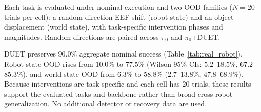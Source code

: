 \documentclass[letterpaper, 10 pt, conference]{ieeeconf}
\begin{document}
Each task is evaluated under nominal execution and two OOD families ($N{=}20$ trials per cell): a random-direction EEF shift (robot state) and an object displacement (world state), with task-specific intervention phases and magnitudes. Random directions are paired across $\pi_0$ and $\pi_0$+DUET.

\setlength{\textfloatsep}{1.2\baselineskip plus 2pt minus 2pt}
\begin{table}[t]
\caption{Franka success (\%, $\pi_0$-base; $N{=}20$/cell, $80$ overall). Robot: random-direction EEF shift; world: object shift. $\Delta$: +DUET minus $\pi_0$.}
\label{tab:real_robot}
\centering
\footnotesize
\setlength{\tabcolsep}{2.6pt}
\end{table}

DUET preserves $90.0\%$ aggregate nominal success (Table~\ref{tab:real_robot}). Robot-state OOD rises from $10.0\%$ to $77.5\%$ (Wilson $95\%$ CIs: $5.2$--$18.5\%$, $67.2$--$85.3\%$), and world-state OOD from $6.3\%$ to $58.8\%$ ($2.7$--$13.8\%$, $47.8$--$68.9\%$). Because interventions are task-specific and each cell has $20$ trials, these results support the evaluated tasks and backbone rather than broad cross-robot generalization. No additional detector or recovery data are used.
\end{document}

